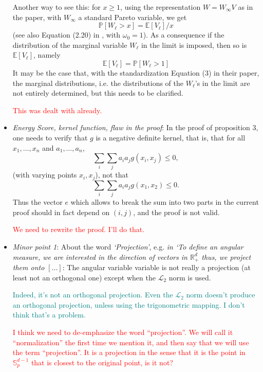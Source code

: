\documentclass[10pt]{article}
\newcommand{\comment}[1]{\textcolor{teal}{#1}}
\newcommand{\bruno}[1]{\textcolor{red}{#1}}
\begin{document}
\begin{itemize}
    Another way to see this: for $x \geq 1$, using the representation $W = W_{\infty}V$ as in the
    paper, with $W_{\infty}$ a standard Pareto variable, we get 
    \[\mathbb{P}\left[W_{\ell} > x\right] = \mathbb{E}\left[V_{\ell}\right] / x\]
    (see also Equation (2.20) in \cite{ferreira2014}, with $\omega_0 = 1$).  As a consequence if 
    the distribution of the marginal variable $W_{\ell}$ in the limit is imposed, then so is 
    $\mathbb{E}\left[V_{\ell}\right]$, namely 
    \[ \mathbb{E}\left[V_{\ell}\right] = \mathbb{P}\left[W_{\ell} > 1\right] \]
    It may be the case that, with the standardization Equation (3) in their paper, the marginal
    distributions, i.e. the distributions of the $W_{\ell}$’s in the limit are not entirely determined, 
    but this needs to be clarified.

    \bruno{This was dealt with already.}

    \item \emph{Energy Score, kernel function, flaw in the proof}: In the proof of proposition 3, 
    one needs to verify that $g$ is a negative definite kernel, that is, that for all $x_1,\ldots,x_n$
    and $a_1,\ldots,a_n$, \[ \sum_i\sum_ja_ia_jg(x_i,x_j)\leq 0,\]
    (with varying points $x_i,x_j$), not that \[\sum_i\sum_ja_ia_jg(x_1,x_2)\leq 0.\]  Thus the vector $e$
    which allows to break the sum into two parts in the current proof should in fact depend on $(i,j)$, 
    and the proof is not valid.

    \bruno{We need to rewrite the proof. I'll do that.}

    \item \emph{Minor point 1}: About the word \emph{‘Projection’}, e.g. \emph{in 
    ‘To define an angular measure, we are interested in the direction of vectors in $\mathbb{R}_+^d$
    thus, we project them onto $[\ldots]$}: The angular variable variable is not really a projection 
    (at least not an orthogonal one) except when the $\mathcal{L}_2$ norm is used.

    \comment{Indeed, it's not an orthogonal projection.  Even the $\mathcal{L}_2$ norm doesn't 
    produce an orthogonal projection, unless using the trigonometric mapping.  I don't think that's
    a problem.}

    \bruno{I think we need to de-emphasize the word ``projection''. We will call it ``normalization''
    the first time we mention it, and then say that we will use the term ``projection''. It is a
    projection in the sense that it is the point in $\mathbb{S}_p^{d-1}$ that is closest to the original
    point, is it not?}


\end{itemize}
\end{document}
